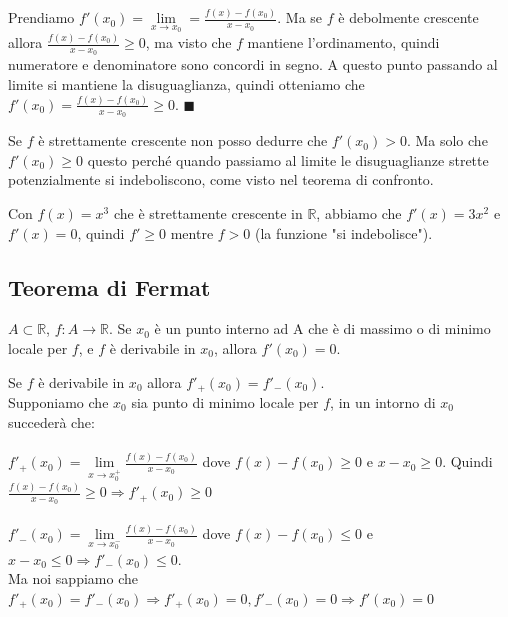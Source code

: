\begin{demostration}
Prendiamo $f'(x_0) = \lim\limits_{x\to x_0} = \frac{f(x) - f(x_0)}{x - x_0}$. Ma se $f$ è debolmente crescente allora $\frac{f(x) - f(x_0)}{x - x_0} \geq 0$, ma visto che $f$ mantiene l'ordinamento, quindi numeratore e denominatore sono concordi in segno. A questo punto passando al limite si mantiene la disuguaglianza, quindi otteniamo che $f'(x_0) = \frac{f(x) - f(x_0)}{x - x_0} \geq 0$. $\blacksquare$
\end{demostration}

\begin{observation}
Se $f$ è strettamente crescente non posso dedurre che $f'(x_0) > 0$.  Ma solo che $f'(x_0) \geq 0$ questo perché quando passiamo al limite le disuguaglianze strette potenzialmente si indeboliscono, come visto nel teorema di confronto. 
\end{observation}

\begin{example}
Con $f(x) = x^3$ che è strettamente crescente in $\mathbb{R}$, abbiamo che $f'(x) = 3x^2$ e $f'(x) = 0$, quindi $f' \geq 0$ mentre $f > 0$ (la funzione "si indebolisce").
\end{example}

\subsection{Teorema di Fermat}
\begin{theorem}
    $A \subset \mathbb{R}$, $f: A\to \mathbb{R}$. Se $x_0$ è un punto interno ad A che è di massimo o di minimo locale per $f$, e $f$ è derivabile in $x_0$, allora $f'(x_0) = 0$.
\end{theorem}

\begin{demostration}
Se $f$ è derivabile in $x_0$ allora $f'_+(x_0) = f'_-(x_0)$.\\
Supponiamo che $x_0$ sia punto di minimo locale per $f$, in un intorno di $x_0$ succederà che:\\\\
$f'_+(x_0) = \lim\limits_{x\to x_0^+}\frac{f(x) - f(x_0)}{x - x_0}$ dove $f(x) - f(x_0) \geq 0$ e $x - x_0 \geq 0$. Quindi $\frac{f(x) - f(x_0)}{x - x_0} \geq 0 \Longrightarrow f'_+(x_0) \geq 0$ \\\\
$f'_-(x_0) = \lim\limits_{x\to x_0^-}\frac{f(x) - f(x_0)}{x - x_0}$ dove $f(x) - f(x_0) \leq 0$ e $x - x_0 \leq 0 \Longrightarrow f'_-(x_0) \leq 0$. \\
Ma noi sappiamo che $f'_+(x_0) = f'_-(x_0) \Longrightarrow f'_+(x_0) = 0, f'_-(x_0) = 0 \Longrightarrow f'(x_0) = 0$
\end{demostration}

